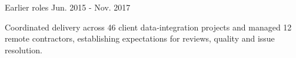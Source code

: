 \begin{cventries}
  \cvsubentryitems
    {\ibmDcaPosition}
    {\ibmDcaDates}
    {}
    {
        \item {\ibmDcaFirstAccomplishment}
        \item {\ibmDcaSecondAccomplishment}
    }

  \cvsubentryitems
    {Earlier roles}
    {Jun. 2015 - Nov. 2017}
    {}
    {
        \item {Coordinated delivery across 46 client data‑integration projects and managed 12 remote contractors, establishing expectations for reviews, quality and issue resolution.}
    }








\end{cventries}
